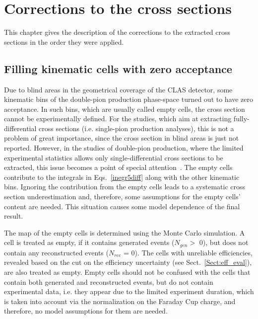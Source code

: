 \chapter{Corrections to the cross sections}
\label{Sect:corr_cr_sect}

This chapter gives the description of the corrections to the extracted cross sections in the order they were applied.


\section{Filling kinematic cells with zero acceptance}
\label{Sect:empt_cells}

Due to blind areas in the geometrical coverage of the CLAS detector, some kinematic bins of the double-pion production phase-space turned out to have zero acceptance. In such bins, which are usually called empty cells, the cross section cannot be experimentally defined. For the studies, which aim at extracting fully-differential cross sections (i.e. single-pion production analyses), this is not a problem of great importance, since the cross section in blind areas is just not reported. However, in the studies of double-pion production, where the limited experimental statistics allows only single-differential cross sections to be extracted, this issue becomes a point of special attention~\cite{Fed_an_note:2007,Fedotov:2008aa,Fed_an_note:2017,Fed_paper_2018,Isupov:2017lnd,Arjun}. The empty cells contribute to the integrals in Eqs.~\eqref{inegr5diff} along with the other kinematic bins. Ignoring the contribution from the empty cells leads to a systematic cross section underestimation and, therefore, some assumptions for the empty cells' content are needed. This situation causes some model dependence of the final result. 


The map of the empty cells is determined using the Monte Carlo simulation. A cell is treated as empty, if it contains generated events ($N_{gen} >$ 0), but does not contain any reconstructed events ($N_{rec}$ = 0). The cells with unreliable efficiencies, revealed based on the cut on the efficiency uncertainty (see Sect.~\ref{Sect:eff_eval}), are also treated as empty. Empty cells should not be confused with the cells that contain both generated and reconstructed events, but do not contain experimental data, i.e. they appear due to the limited experiment duration, which is taken into account via the normalization on the Faraday Cup charge, and therefore, no model assumptions for them are needed. 




